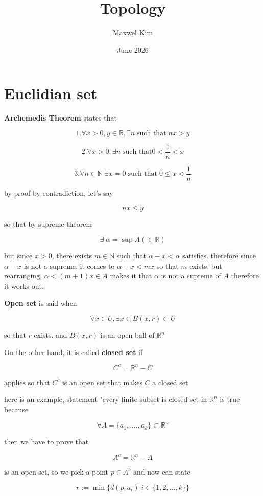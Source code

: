 \documentclass{article}
\title{Topology}
\author{Maxwel Kim}
\date{June 2026}
\begin{document}
\maketitle

\section*{Euclidian set}

\textbf{Archemedis Theorem} states that 

\[
1. \forall x>0, y\in \mathbb{R}, \exists n \; \text{such that} \; nx>y
\]

\[
2. \forall x>0, \exists n \; \text{such that} 0<\frac{1}{n}<x
\]

\[
3. \forall n\in \mathbb{N} \; \exists x=0 \; \text{such that} \; 0\leq x<\frac{1}{n} 
\]

by proof by contradiction, let's say

\[
nx\leq y
\]

so that by supreme theorem

\[
\exists \; \alpha =\sup A(\in \mathbb{R})
\]

but since $x>0$, there exists $m\in \mathbb{N}$ such that $\alpha-x<\alpha$ satisfies. therefore since $\alpha-x$ is not a supreme, it comes to $\alpha-x<mx$ so that $m$ exists, but rearranging, $\alpha<(m+1)x\in A$ makes it that $\alpha$ is not a supreme of $A$ therefore it works out.

\textbf{Open set} is said when 

\[
\forall x\in U, \exists x\in B(x,r)\subset U
\]

so that $r$ exists. and $B(x,r)$ is an open ball of $\mathbb{R}^n$ 

On the other hand, it is called \textbf{closed set} if 

\[
C^c=\mathbb{R}^n-C
\]

applies so that $C^c$ is an open set that makes $C$ a closed set

here is an example, statement "every finite subset is closed set in $\mathbb{R}^n$ is true because

\[
\forall A=\{a_1,....,a_k\}\subset \mathbb{R}^n
\]

then we have to prove that 

\[
A^c=\mathbb{R}^n-A
\]

is an open set, so we pick a point $p\in A^c$ and now can state

\[
r := \min\{d(p,a_i)|i\in \{1,2,...,k\}\}
\]
\end{document}
